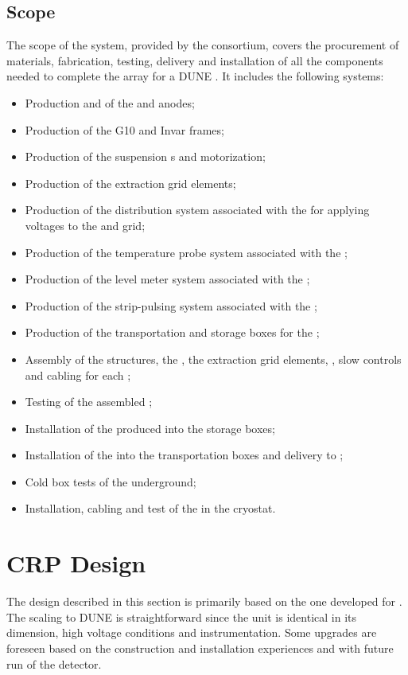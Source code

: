 \subsection{Scope}
\label{ch:dp-crp-scope}

The scope of the  system, provided by the  consortium, covers the procurement of materials, fabrication, testing, delivery and installation of all the components needed to complete the  array for a DUNE \dpmod. It includes the following systems: 
\begin{itemize}
\item  Production and  of the  and anodes;
\item  Production of the G10 and Invar frames;
\item Production of the suspension \fdth{}s and motorization;
\item Production of the extraction grid elements;
\item Production of the  distribution system associated with the  for applying voltages to the  and grid;
\item Production of the temperature probe system associated with the ;
\item Production of the level meter system associated with the ;
\item Production of the strip-pulsing system  %
associated with the ;
\item Production of the transportation and storage boxes for the ;
\item Assembly of the  structures, the , the extraction grid elements, , slow controls and cabling for each ;
\item Testing of the assembled ;
\item Installation of the produced  into the storage boxes;
\item Installation of the  into the transportation boxes and delivery to \surf{}; %
\item Cold box tests of the  underground;
\item Installation, cabling and test of the  in the cryostat.
\end{itemize}

\section{CRP Design}
\label{ch:dp-crp-design}
The design described in this section is primarily based on the one developed for . The scaling to DUNE  is straightforward since the  unit is identical in its dimension, high voltage conditions and instrumentation. Some upgrades are foreseen based on the  construction and installation experiences and with future run of the detector.

